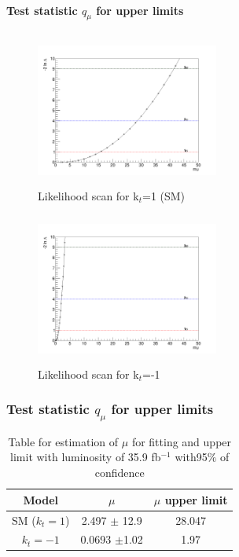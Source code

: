 \documentclass[11pt]{beamer}
\begin{document}
\begin{frame}
\framesubtitle{Test statistic $q_{\mu}$ for upper limits}
\begin{minipage}{0.5\textwidth}
	\begin{center}
		\begin{figure}
			\includegraphics[width=6cm,height=5cm]{figures/Likelihood.png}
			\caption*{Likelihood scan for k$_t$=1 (SM)}
		\end{figure}
	\end{center}
\end{minipage}\hfill
\begin{minipage}{0.5\textwidth}
	\begin{center}
		\begin{figure}
			\includegraphics[width=6cm,height=5cm]{figures/kt-1/Likelihood-kt-1.png}
			\caption*{Likelihood scan for k$_t$=-1}
		\end{figure}
	\end{center}
\end{minipage}
\end{frame}




\begin{frame}
\frametitle{Test statistic $q_{\mu}$ for upper limits}

\begin{table}
	\caption*{Table for estimation of $\mu$ for fitting and upper limit with luminosity of 35.9 fb$^{-1}$ with95$\%$ of confidence }
	\begin{tabular}{|c|c|c|}
		\hline
		Model	&$\mu$ &$\mu$ upper limit  \\
		\hline
		SM ($k_t=1$)& 2.497 $\pm$ 12.9&	28.047    \\
		\hline
	$k_t=-1$	&0.0693 $\pm$1.02  &1.97 \\
		\hline
	\end{tabular}
\end{table}
\end{frame}
\end{document}
